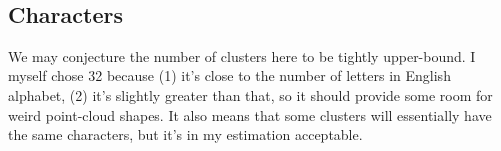 \documentclass[11pt]{article}
\begin{document}
    \begin{center}
    \end{center}
    { \hspace*{\fill} \\}
    
    \hypertarget{characters}{%
\subsection{Characters}\label{characters}}

We may conjecture the number of clusters here to be tightly upper-bound.
I myself chose 32 because (1) it's close to the number of letters in
English alphabet, (2) it's slightly greater than that, so it should
provide some room for weird point-cloud shapes. It also means that some
clusters will essentially have the same characters, but it's in my
estimation acceptable.
\end{document}
